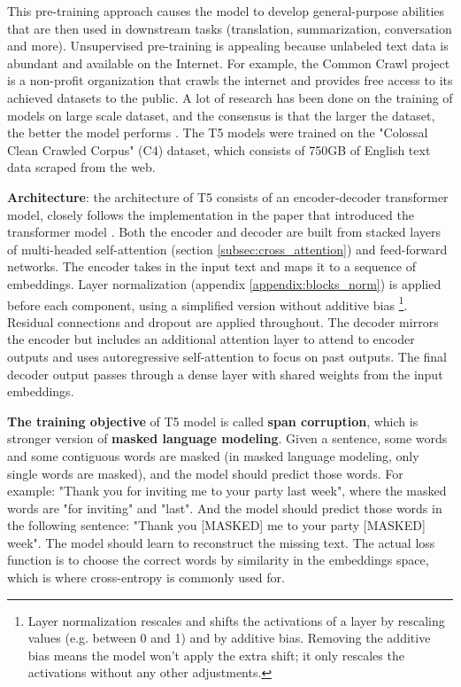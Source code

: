 This pre-training approach causes the model to develop general-purpose abilities that are then used in downstream tasks (translation, summarization, conversation and more). Unsupervised pre-training is appealing because unlabeled text data is abundant and available on the Internet. For example, the Common Crawl project \cite{common_crawl_project} is a non-profit organization that crawls the internet and provides free access to its achieved datasets to the public. A lot of research has been done on the training of models on large scale dataset, and the consensus is that the larger the dataset, the better the model performs \cite{radford2019language} \cite{jozefowicz2016exploring} \cite{hestness2017deep}. The T5 models were trained on the "Colossal Clean Crawled Corpus" (C4) dataset, which consists of 750GB of English text data scraped from the web.

\textbf{Architecture}: the architecture of T5 consists of an encoder-decoder transformer model, closely follows the implementation in the paper that introduced the transformer model \cite{transformer}. Both the encoder and decoder are built from stacked layers of multi-headed self-attention (section \ref{subsec:cross_attention}) and feed-forward networks. The encoder takes in the input text and maps it to a sequence of embeddings. Layer normalization (appendix \ref{appendix:blocks_norm}) is applied before each component, using a simplified version without additive bias \footnote{Layer normalization rescales and shifts the activations of a layer by rescaling values (e.g. between 0 and 1) and by additive bias. Removing the additive bias means the model won't apply the extra shift; it only rescales the activations without any other adjustments.}. Residual connections and dropout are applied throughout. The decoder mirrors the encoder but includes an additional attention layer to attend to encoder outputs and uses autoregressive self-attention to focus on past outputs. The final decoder output passes through a dense layer with shared weights from the input embeddings.

\textbf{The training objective} of T5 model is called \textbf{span corruption}, which is stronger version of \textbf{masked language modeling}. Given a sentence, some words and some contiguous words are masked (in masked language modeling, only single words are masked), and the model should predict those words. For example: "Thank you for inviting me to your party last week", where the masked words are "for inviting" and "last". And the model should predict those words in the following sentence: "Thank you [MASKED] me to your party [MASKED] week". The model should learn to reconstruct the missing text. The actual loss function is to choose the correct words by similarity in the embeddings space, which is where cross-entropy is commonly used for.

